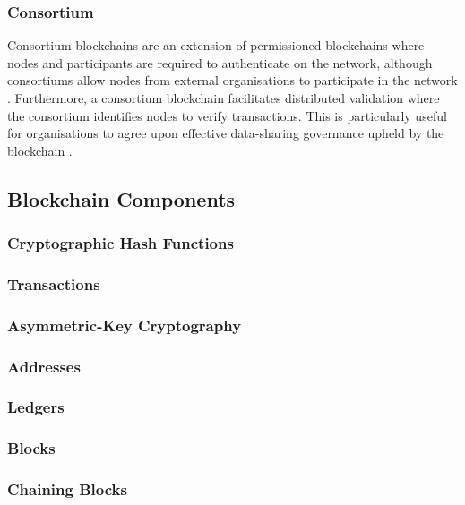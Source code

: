 \subsubsection{Consortium}

Consortium blockchains are an extension of permissioned blockchains where nodes and participants are required to authenticate on the network, although consortiums allow nodes from external organisations to participate in the network \autocite{butijnBlockchainsSystematicMultivocal2020}. Furthermore, a consortium blockchain facilitates distributed validation where the consortium identifies nodes to verify transactions. This is particularly useful for organisations to agree upon effective data-sharing governance upheld by the blockchain \autocite{imteajIntroductionBlockchainTechnology2021}.

\subsection{Blockchain Components}

\subsubsection{Cryptographic Hash Functions}

\subsubsection{Transactions}

\subsubsection{Asymmetric-Key Cryptography}

\subsubsection{Addresses}

\subsubsection{Ledgers}

\subsubsection{Blocks}

\subsubsection{Chaining Blocks}

